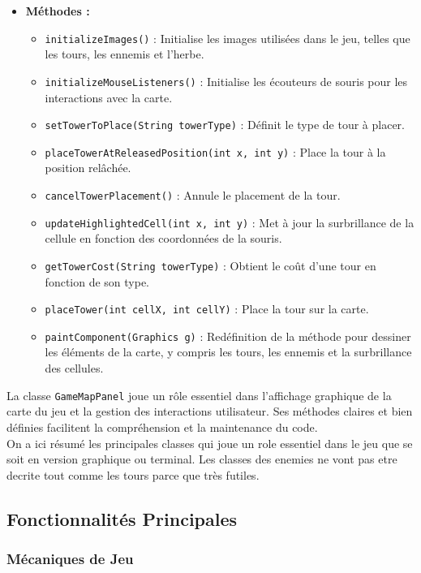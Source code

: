 \documentclass{article}
\begin{document}
\begin{itemize}
\item \textbf{Méthodes :}
\begin{itemize}
    \item \texttt{initializeImages()} : Initialise les images utilisées dans le jeu, telles que les tours, les ennemis et l'herbe.
    \item \texttt{initializeMouseListeners()} : Initialise les écouteurs de souris pour les interactions avec la carte.
    \item \texttt{setTowerToPlace(String towerType)} : Définit le type de tour à placer.
    \item \texttt{placeTowerAtReleasedPosition(int x, int y)} : Place la tour à la position relâchée.
    \item \texttt{cancelTowerPlacement()} : Annule le placement de la tour.
    \item \texttt{updateHighlightedCell(int x, int y)} : Met à jour la surbrillance de la cellule en fonction des coordonnées de la souris.
    \item \texttt{getTowerCost(String towerType)} : Obtient le coût d'une tour en fonction de son type.
    \item \texttt{placeTower(int cellX, int cellY)} : Place la tour sur la carte.
    \item \texttt{paintComponent(Graphics g)} : Redéfinition de la méthode pour dessiner les éléments de la carte, y compris les tours, les ennemis et la surbrillance des cellules.
\end{itemize}
\end{itemize}

La classe \texttt{GameMapPanel} joue un rôle essentiel dans l'affichage graphique de la carte du jeu et la gestion des interactions utilisateur. Ses méthodes claires et bien définies facilitent la compréhension et la maintenance du code.\\

On a ici résumé les principales classes qui joue un role essentiel dans le jeu que se soit en version graphique ou terminal. Les classes des enemies ne vont pas etre decrite tout comme les tours parce que très futiles.

\subsection{Fonctionnalités Principales}

\subsubsection{Mécaniques de Jeu}
\end{document}
